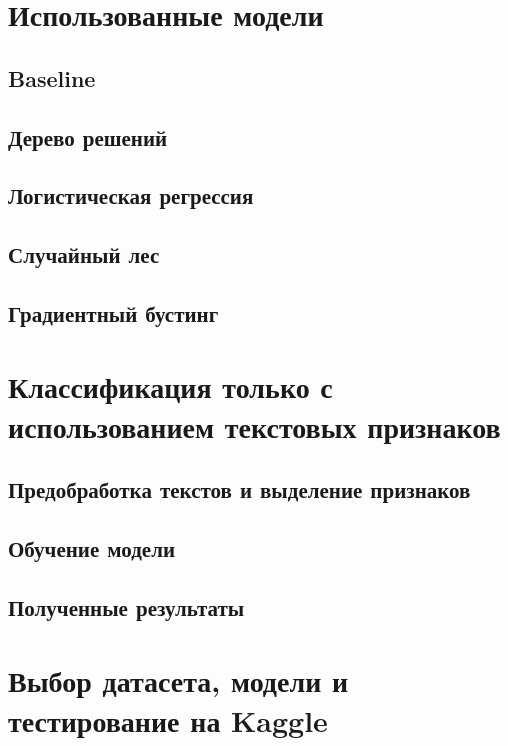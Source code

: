 \documentclass[14pt]{mmcs_article}
\begin{document}
\newpage
\section{Использованные модели}

\subsection{Baseline}

\subsection{Дерево решений}

\subsection{Логистическая регрессия}

\subsection{Случайный лес}

\subsection{Градиентный бустинг}

\newpage
\section{Классификация только с использованием текстовых признаков}

\subsection{Предобработка текстов и выделение признаков}

\subsection{Обучение модели}

\subsection{Полученные результаты}

\newpage
\section{Выбор датасета, модели и тестирование на Kaggle}
\end{document}
